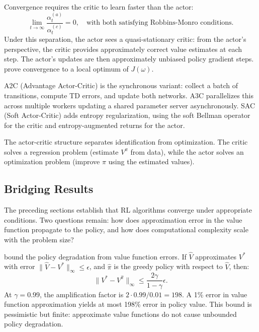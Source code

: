 Convergence requires the critic to learn faster than the actor:
\begin{equation}
\lim_{t \to \infty} \frac{\alpha_t^{(a)}}{\alpha_t^{(c)}} = 0, \quad \text{with both satisfying Robbins-Monro conditions.}
\end{equation}
Under this separation, the actor sees a quasi-stationary critic: from the actor's perspective, the critic provides approximately correct value estimates at each step. The actor's updates are then approximately unbiased policy gradient steps. \citet{konda2000} prove convergence to a local optimum of $J(\omega)$.

A2C (Advantage Actor-Critic) is the synchronous variant: collect a batch of transitions, compute TD errors, and update both networks. A3C \citep{mnih2016a3c} parallelizes this across multiple workers updating a shared parameter server asynchronously. SAC (Soft Actor-Critic) \citep{Haarnoja2018} adds entropy regularization, using the soft Bellman operator for the critic and entropy-augmented returns for the actor.

The actor-critic structure separates identification from optimization. The critic solves a regression problem (estimate $V^\pi$ from data), while the actor solves an optimization problem (improve $\pi$ using the estimated values).


\subsection{Bridging Results}
\label{sec:bridging_results}

The preceding sections establish that RL algorithms converge under appropriate conditions. Two questions remain: how does approximation error in the value function propagate to the policy, and how does computational complexity scale with the problem size?

\citet{singh1994} bound the policy degradation from value function errors. If $\hat{V}$ approximates $V^*$ with error $\|\hat{V} - V^*\|_\infty \leq \epsilon$, and $\hat{\pi}$ is the greedy policy with respect to $\hat{V}$, then:
\begin{equation}
\|V^* - V^{\hat{\pi}}\|_\infty \leq \frac{2\gamma}{1-\gamma} \epsilon.
\label{eq:singh_yee}
\end{equation}
At $\gamma = 0.99$, the amplification factor is $2 \cdot 0.99 / 0.01 = 198$. A 1\% error in value function approximation yields at most 198\% error in policy value. This bound is pessimistic but finite: approximate value functions do not cause unbounded policy degradation.

